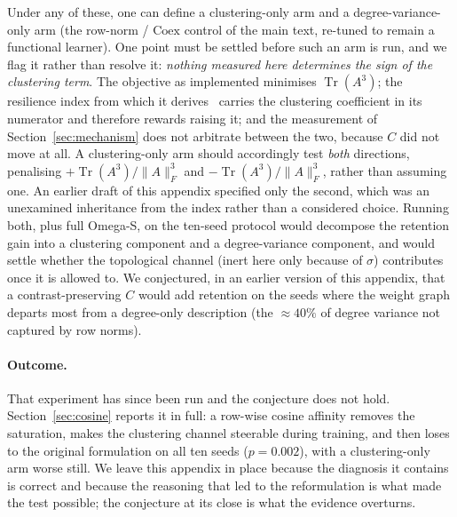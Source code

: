 \documentclass[11pt,a4paper]{article}
\begin{document}
Under any of these, one can define a clustering-only arm and a
degree-variance-only arm (the row-norm / $\mathrm{Coex}$ control of the main
text, re-tuned to remain a functional learner). One point must be settled
before such an arm is run, and we flag it rather than resolve it: \emph{nothing
measured here determines the sign of the clustering term}. The objective as
implemented minimises $\operatorname{Tr}(A^3)$; the resilience index from which
it derives~\cite{acedo2026fsri} carries the clustering coefficient in its
numerator and therefore rewards raising it; and the measurement of
Section~\ref{sec:mechanism} does not arbitrate between the two, because $C$ did
not move at all. A clustering-only arm should accordingly test \emph{both}
directions, penalising $+\operatorname{Tr}(A^3)/\lVert A\rVert_F^3$ and
$-\operatorname{Tr}(A^3)/\lVert A\rVert_F^3$, rather than assuming one. An
earlier draft of this appendix specified only the second, which was an
unexamined inheritance from the index rather than a considered choice. Running both,
plus full Omega-S, on the ten-seed protocol would decompose the retention
gain into a clustering component and a degree-variance component, and would
settle whether the topological channel (inert here only because of
$\sigma$) contributes once it is allowed to. We conjectured, in an earlier version of this
appendix, that a contrast-preserving $C$ would add retention on the seeds
where the weight graph departs most from a degree-only description (the
$\approx40\%$ of degree variance not captured by row norms).

\paragraph{Outcome.} That experiment has since been run and the conjecture
does not hold. Section~\ref{sec:cosine} reports it in full: a row-wise cosine
affinity removes the saturation, makes the clustering channel steerable during
training, and then loses to the original formulation on all ten seeds
($p=0.002$), with a clustering-only arm worse still. We leave this appendix
in place because the diagnosis it contains is correct and because the
reasoning that led to the reformulation is what made the test possible; the
conjecture at its close is what the evidence overturns.
\end{document}
